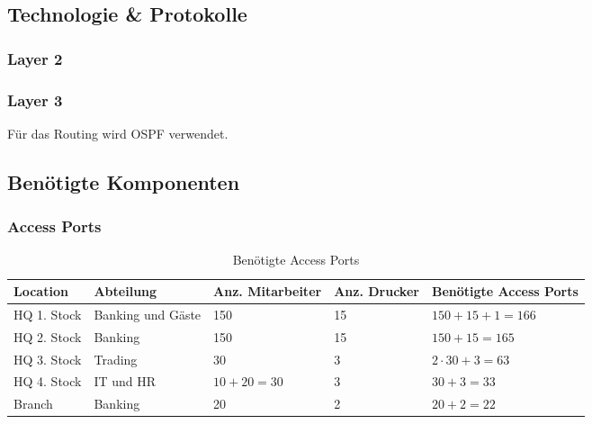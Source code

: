 \subsection{Technologie \& Protokolle}
\subsubsection{Layer 2}
\subsubsection{Layer 3}
Für das Routing wird OSPF verwendet. 

\subsection{Benötigte Komponenten}
\subsubsection{Access Ports}
\begin{table}[h]
	\centering
	\begin{tabu} to \linewidth {l l l l l}
		\toprule 
		Location & Abteilung & Anz. Mitarbeiter & Anz. Drucker & Benötigte Access Ports \\
		\midrule
		HQ 1. Stock & Banking und Gäste & 150 & 15 & $150 + 15 + 1 = 166$ \\ 
		HQ 2. Stock & Banking & 150 & 15 & $150 + 15 = 165$ \\
		HQ 3. Stock & Trading & 30 & 3 & $2 \cdot 30 + 3 = 63$ \\ 
		HQ 4. Stock & IT und HR & $10 + 20 = 30$ & 3 & $30 + 3 = 33$\\
		Branch  & Banking & 20 & 2 & $20 + 2 = 22$\\
		\bottomrule 
	\end{tabu} 
	\label{tbl:require_access_ports}
	\caption{Benötigte Access Ports}
\end{table}

